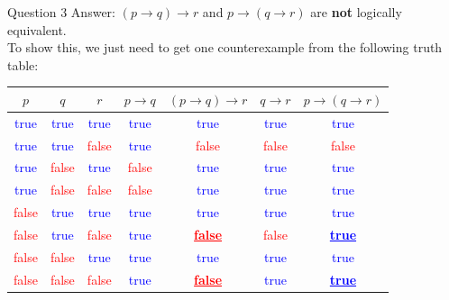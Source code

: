 \documentclass[10pt]{beamer}
\begin{document}
\begin{frame}[fragile]{Question 3}
Answer: $(p \rightarrow q) \rightarrow r$ and $p \rightarrow (q \rightarrow r)$ are \textbf{not} logically equivalent.\\
To show this, we just need to get one counterexample from the following truth table:
\begin{table} 
\centering 
\begin{tabular}{|c|c|c|c|c|c|c|} 

\hline $p$ & $q$ & $r$ & $p \rightarrow q$ & $(p \rightarrow q) \rightarrow r$ & $q \rightarrow r$ & $p \rightarrow (q \rightarrow r)$ \\

 
\hline \textcolor{blue}{true} & 
\textcolor{blue}{true} & 
\textcolor{blue}{true} & 
\textcolor{blue}{true} & 
\textcolor{blue}{true} & 
\textcolor{blue}{true} & 
\textcolor{blue}{true} \\

 
\hline \textcolor{blue}{true} & 
\textcolor{blue}{true} & 
\textcolor{red}{false} & 
\textcolor{blue}{true} & 
\textcolor{red}{false} & 
\textcolor{red}{false} & 
\textcolor{red}{false} \\

 
\hline \textcolor{blue}{true} & 
\textcolor{red}{false} & 
\textcolor{blue}{true} & 
\textcolor{red}{false} & 
\textcolor{blue}{true} & 
\textcolor{blue}{true} & 
\textcolor{blue}{true} \\

 
\hline \textcolor{blue}{true} & 
\textcolor{red}{false} & 
\textcolor{red}{false} & 
\textcolor{red}{false} & 
\textcolor{blue}{true} & 
\textcolor{blue}{true} & 
\textcolor{blue}{true} \\

 
\hline 
\textcolor{red}{false} & 
\textcolor{blue}{true} & 
\textcolor{blue}{true} & 
\textcolor{blue}{true} & 
\textcolor{blue}{true} & 
\textcolor{blue}{true} & 
\textcolor{blue}{true} \\

 
\hline 
\textcolor{red}{false} & 
\textcolor{blue}{true} & 
\textcolor{red}{false} & 
\textcolor{blue}{true} & 
\textcolor{red}{\underline{\textbf{false}}} & 
\textcolor{red}{false} & 
\textcolor{blue}{\underline{\textbf{true}}} \\

 
\hline 
\textcolor{red}{false} & 
\textcolor{red}{false} & 
\textcolor{blue}{true} & 
\textcolor{blue}{true} & 
\textcolor{blue}{true} & 
\textcolor{blue}{true} & 
\textcolor{blue}{true} \\

 
\hline 
\textcolor{red}{false} & 
\textcolor{red}{false} & 
\textcolor{red}{false} & 
\textcolor{blue}{true} & 
\textcolor{red}{\underline{\textbf{false}}} & 
\textcolor{blue}{true} & 
\textcolor{blue}{\underline{\textbf{true}}} \\


\hline 
\end{tabular} 
\end{table}
\end{frame}
\end{document}
